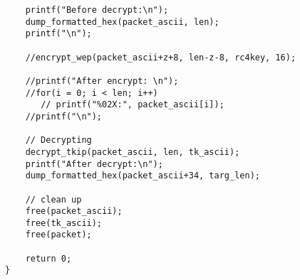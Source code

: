 \documentclass[main.tex]{subfiles} \label{sec9}
\begin{document}
\begin{verbatim}
    printf("Before decrypt:\n");
    dump_formatted_hex(packet_ascii, len);
    printf("\n");

    //encrypt_wep(packet_ascii+z+8, len-z-8, rc4key, 16);

    //printf("After encrypt: \n");
    //for(i = 0; i < len; i++)
       // printf("%02X:", packet_ascii[i]);
    //printf("\n");
    
    // Decrypting
    decrypt_tkip(packet_ascii, len, tk_ascii);
    printf("After decrypt:\n");
    dump_formatted_hex(packet_ascii+34, targ_len);

    // clean up
    free(packet_ascii);
    free(tk_ascii); 
    free(packet);
    
    return 0;    
}

\end{verbatim}
\end{document}
